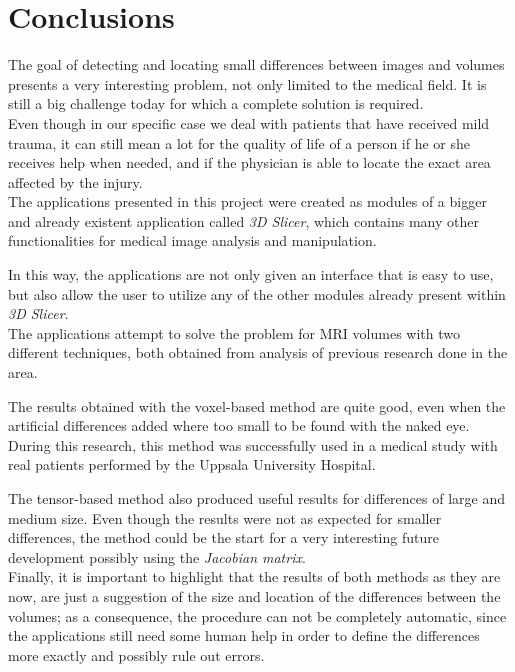 \chapter{Conclusions}

The goal of detecting and locating small differences between images
and volumes presents a very interesting problem, not only limited to
the medical field. It is still a big challenge today for which a
complete solution is required.\\

Even though in our specific case we deal with patients that have
received mild trauma, it can still mean a lot for the quality of life
of a person if he or she receives help when needed, and if the
physician is able to locate the exact area affected by the injury.\\

The applications presented in this project were created as modules of
a bigger and already existent application called \textit{3D Slicer},
which contains many other functionalities for medical image analysis
and manipulation.

In this way, the applications are not only given an interface that is
easy to use, but also allow the user to utilize any of the
other modules already present within \textit{3D Slicer}.\\

The applications attempt to solve the problem for MRI volumes with two
different techniques, both obtained from analysis of previous research
done in the area.

The results obtained with the voxel-based method are quite good, even
when the artificial differences added where too small to be found with
the naked eye. During this research, this method was successfully used
in a medical study with real patients performed by the Uppsala
University Hospital.

The tensor-based method also produced useful results for differences
of large and medium size. Even though the results were not as expected
for smaller differences, the method could be the start for a very
interesting future development possibly using the \textit{Jacobian
  matrix}.\\

Finally, it is important to highlight that the results of both methods
as they are now, are just a suggestion of the size and location of the
differences between the volumes; as a consequence, the procedure can
not be completely automatic, since the applications still need some
human help in order to define the differences more exactly and
possibly rule out errors.


